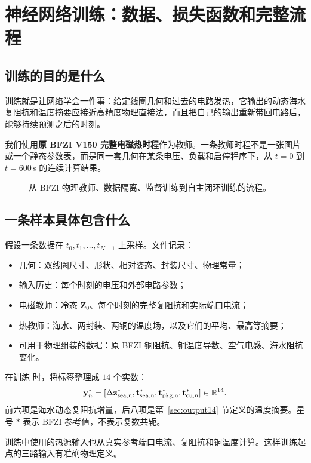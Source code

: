 \chapter{神经网络训练：数据、损失函数和完整流程}
\label{ch:training}

\section{训练的目的是什么}
训练就是让网络学会一件事：给定线圈几何和过去的电路发热，它输出的动态海水复阻抗和温度摘要应接近高精度物理直接法，而且把自己的输出重新带回电路后，能够持续预测之后的时刻。

我们使用\textbf{原 BFZI V150 完整电磁热时程}作为教师。一条教师时程不是一张图片或一个静态参数表，而是同一套几何在某条电压、负载和启停程序下，从 $t=0$ 到 $t=600$\,s 的连续计算结果。

\begin{figure}[htbp]
\centering\resizebox{\textwidth}{!}{}
\caption{从 BFZI 物理教师、数据隔离、监督训练到自主闭环训练的流程。}
\label{fig:training}
\end{figure}

\section{一条样本具体包含什么}
假设一条数据在 $t_0,t_1,\dots,t_{N-1}$ 上采样。文件记录：
\begin{itemize}
\item 几何：双线圈尺寸、形状、相对姿态、封装尺寸、物理常量；
\item 输入历史：每个时刻的电压和外部电路参数；
\item 电磁教师：冷态 $\mathbf Z_0$、每个时刻的完整复阻抗和实际端口电流；
\item 热教师：海水、两封装、两铜的温度场，以及它们的平均、最高等摘要；
\item 可用于物理组装的数据：原 BFZI 铜阻抗、铜温度导数、空气电感、海水阻抗变化。
\end{itemize}

在训练  时，将标签整理成 $14$ 个实数：
\[
\mathbf y_n^{*}=
[\Delta\mathbf z_{\rm sea,n}^{*},
 \mathbf t_{\rm sea,n}^{*},
 \mathbf t_{\rm pkg,n}^{*},
 \mathbf t_{\rm cu,n}^{*}]
\in\mathbb R^{14}.
\]
前六项是海水动态复阻抗增量，后八项是第~\ref{sec:output14} 节定义的温度摘要。星号 $*$ 表示 BFZI 参考值，不表示复数共轭。

训练中使用的热源输入也从真实参考端口电流、复阻抗和铜温度计算。这样训练起点的三路输入有准确物理定义。

